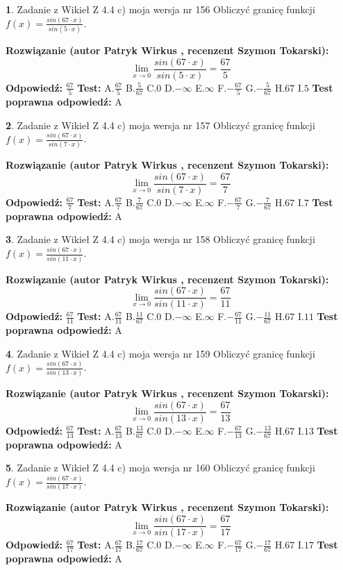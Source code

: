 \documentclass[12pt, a4paper]{article}
\theoremstyle{definition} %
\newtheorem{zad}{}
\newcommand{\zadStart}[1]{\begin{zad}#1\newline}
\newcommand{\zadStop}{\end{zad}}
\newcommand{\rozwStart}[2]{\noindent \textbf{Rozwiązanie (autor #1 , recenzent #2): }\newline}
\newcommand{\rozwStop}{\newline}
\newcommand{\odpStart}{\noindent \textbf{Odpowiedź:}\newline}
\newcommand{\odpStop}{\newline}
\newcommand{\testStart}{\noindent \textbf{Test:}\newline}
\newcommand{\testStop}{\newline}
\newcommand{\kluczStart}{\noindent \textbf{Test poprawna odpowiedź:}\newline}
\newcommand{\kluczStop}{\newline}
\begin{document}
\zadStart{Zadanie z Wikieł Z 4.4 c) moja wersja nr 156}
Obliczyć granicę funkcji $f(x)=\frac{sin(67\cdot x)}{sin(5\cdot x)}$.
\zadStop
\rozwStart{Patryk Wirkus}{Szymon Tokarski}
$$\lim\limits_{x\to 0}\frac{sin(67\cdot x)}{sin(5\cdot x)}=
\frac{67}{5}$$
\rozwStop
\odpStart
$\frac{67}{5}$
\odpStop
\testStart
A.$\frac{67}{5}$
B.$\frac{5}{67}$
C.$0$
D.$-\infty$
E.$\infty$
F.$-\frac{67}{5}$
G.$-\frac{5}{67}$
H.$67$
I.$5$
\testStop
\kluczStart
A
\kluczStop



\zadStart{Zadanie z Wikieł Z 4.4 c) moja wersja nr 157}
Obliczyć granicę funkcji $f(x)=\frac{sin(67\cdot x)}{sin(7\cdot x)}$.
\zadStop
\rozwStart{Patryk Wirkus}{Szymon Tokarski}
$$\lim\limits_{x\to 0}\frac{sin(67\cdot x)}{sin(7\cdot x)}=
\frac{67}{7}$$
\rozwStop
\odpStart
$\frac{67}{7}$
\odpStop
\testStart
A.$\frac{67}{7}$
B.$\frac{7}{67}$
C.$0$
D.$-\infty$
E.$\infty$
F.$-\frac{67}{7}$
G.$-\frac{7}{67}$
H.$67$
I.$7$
\testStop
\kluczStart
A
\kluczStop



\zadStart{Zadanie z Wikieł Z 4.4 c) moja wersja nr 158}
Obliczyć granicę funkcji $f(x)=\frac{sin(67\cdot x)}{sin(11\cdot x)}$.
\zadStop
\rozwStart{Patryk Wirkus}{Szymon Tokarski}
$$\lim\limits_{x\to 0}\frac{sin(67\cdot x)}{sin(11\cdot x)}=
\frac{67}{11}$$
\rozwStop
\odpStart
$\frac{67}{11}$
\odpStop
\testStart
A.$\frac{67}{11}$
B.$\frac{11}{67}$
C.$0$
D.$-\infty$
E.$\infty$
F.$-\frac{67}{11}$
G.$-\frac{11}{67}$
H.$67$
I.$11$
\testStop
\kluczStart
A
\kluczStop



\zadStart{Zadanie z Wikieł Z 4.4 c) moja wersja nr 159}
Obliczyć granicę funkcji $f(x)=\frac{sin(67\cdot x)}{sin(13\cdot x)}$.
\zadStop
\rozwStart{Patryk Wirkus}{Szymon Tokarski}
$$\lim\limits_{x\to 0}\frac{sin(67\cdot x)}{sin(13\cdot x)}=
\frac{67}{13}$$
\rozwStop
\odpStart
$\frac{67}{13}$
\odpStop
\testStart
A.$\frac{67}{13}$
B.$\frac{13}{67}$
C.$0$
D.$-\infty$
E.$\infty$
F.$-\frac{67}{13}$
G.$-\frac{13}{67}$
H.$67$
I.$13$
\testStop
\kluczStart
A
\kluczStop



\zadStart{Zadanie z Wikieł Z 4.4 c) moja wersja nr 160}
Obliczyć granicę funkcji $f(x)=\frac{sin(67\cdot x)}{sin(17\cdot x)}$.
\zadStop
\rozwStart{Patryk Wirkus}{Szymon Tokarski}
$$\lim\limits_{x\to 0}\frac{sin(67\cdot x)}{sin(17\cdot x)}=
\frac{67}{17}$$
\rozwStop
\odpStart
$\frac{67}{17}$
\odpStop
\testStart
A.$\frac{67}{17}$
B.$\frac{17}{67}$
C.$0$
D.$-\infty$
E.$\infty$
F.$-\frac{67}{17}$
G.$-\frac{17}{67}$
H.$67$
I.$17$
\testStop
\kluczStart
A
\kluczStop
\end{document}
